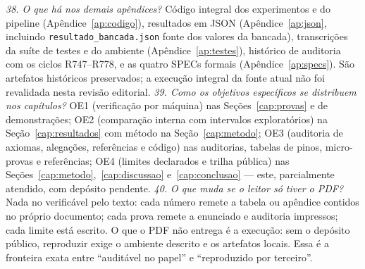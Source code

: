 \textit{38. O que há nos demais apêndices?} Código integral dos experimentos e do pipeline (Apêndice~\ref{ap:codigo}), resultados em JSON (Apêndice~\ref{ap:json}, incluindo \nolinkurl{resultado_bancada.json} fonte dos valores da bancada), transcrições da suíte de testes e do ambiente (Apêndice~\ref{ap:testes}), histórico de auditoria com os ciclos R747--R778, e as quatro SPECs formais (Apêndice~\ref{ap:specs}). São artefatos históricos preservados; a execução integral da fonte atual não foi revalidada nesta revisão editorial.
\textit{39. Como os objetivos específicos se distribuem nos capítulos?} OE1 (verificação por máquina) nas Seções~\ref{cap:provas} e de demonstrações; OE2 (comparação interna com intervalos exploratórios) na Seção~\ref{cap:resultados} com método na Seção~\ref{cap:metodo}; OE3 (auditoria de axiomas, alegações, referências e código) nas auditorias, tabelas de pinos, micro-provas e referências; OE4 (limites declarados e trilha pública) nas Seções~\ref{cap:metodo},~\ref{cap:discussao} e~\ref{cap:conclusao} --- este, parcialmente atendido, com depósito pendente.
\textit{40. O que muda se o leitor só tiver o PDF?} Nada no verificável pelo texto: cada número remete a tabela ou apêndice contidos no próprio documento; cada prova remete a enunciado e auditoria impressos; cada limite está escrito. O que o PDF não entrega é a execução: sem o depósito público, reproduzir exige o ambiente descrito e os artefatos locais. Essa é a fronteira exata entre ``auditável no papel'' e ``reproduzido por terceiro''.
